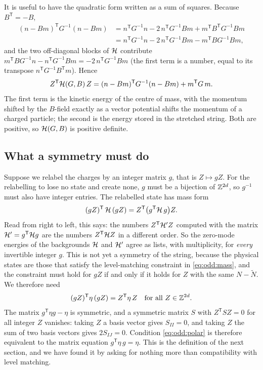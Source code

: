 It is useful to have the quadratic form written as a sum of squares. Because
$B^{\mathsf T}=-B$,
\begin{align}
 (n-Bm)^{\mathsf T}G^{-1}(n-Bm)
 &=n^{\mathsf T}G^{-1}n-2\,n^{\mathsf T}G^{-1}Bm+m^{\mathsf T}B^{\mathsf T}G^{-1}Bm\nonumber\\
 &=n^{\mathsf T}G^{-1}n-2\,n^{\mathsf T}G^{-1}Bm-m^{\mathsf T}BG^{-1}Bm ,\nonumber
\end{align}
and the two off-diagonal blocks of $\mathcal{H}$ contribute
$m^{\mathsf T}BG^{-1}n-n^{\mathsf T}G^{-1}Bm=-2\,n^{\mathsf T}G^{-1}Bm$ (the first term is a
number, equal to its transpose $n^{\mathsf T}G^{-1}B^{\mathsf T}m$). Hence
\begin{equation}\label{eq:odd:squares}
 Z^{\mathsf T}\mathcal{H}(G,B)\,Z=(n-Bm)^{\mathsf T}G^{-1}(n-Bm)+m^{\mathsf T}G\,m .
\end{equation}
The first term is the kinetic energy of the centre of mass, with the momentum shifted by the
$B$-field exactly as a vector potential shifts the momentum of a charged particle; the
second is the energy stored in the stretched string. Both are positive, so $\mathcal{H}(G,B)$ is
positive definite.

\subsection{What a symmetry must do}

Suppose we relabel the charges by an integer matrix $g$, that is $Z\mapsto gZ$. For the
relabelling to lose no state and create none, $g$ must be a bijection of $\mathbb{Z}^{2d}$, so
$g^{-1}$ must also have integer entries. The relabelled state has mass form
\begin{equation}\label{eq:odd:covariance}
 (gZ)^{\mathsf T}\,\mathcal{H}\,(gZ)=Z^{\mathsf T}\big(g^{\mathsf T}\mathcal{H}\, g\big)Z .
\end{equation}
Read from right to left, this says: the numbers $Z^{\mathsf T}\mathcal{H}'Z$ computed with the
matrix $\mathcal{H}'=g^{\mathsf T}\mathcal{H} g$ are the numbers $Z^{\mathsf T}\mathcal{H} Z$ in a different order.
So the zero-mode energies of the backgrounds $\mathcal{H}$ and $\mathcal{H}'$ agree as lists, with
multiplicity, for \emph{every} invertible integer $g$. This is not yet a symmetry of the
string, because the physical states are those that satisfy the level-matching constraint in
\eqref{eq:odd:mass}, and the constraint must hold for $gZ$ if and only if it holds for $Z$
with the same $N-\tilde N$. We therefore need
\begin{equation}\label{eq:odd:polar}
 (gZ)^{\mathsf T}\eta\,(gZ)=Z^{\mathsf T}\eta\,Z\quad\text{for all }Z\in\mathbb{Z}^{2d}.
\end{equation}
The matrix $g^{\mathsf T}\eta g-\eta$ is symmetric, and a symmetric matrix $S$ with
$Z^{\mathsf T}SZ=0$ for all integer $Z$ vanishes: taking $Z$ a basis vector gives
$S_{II}=0$, and taking $Z$ the sum of two basis vectors gives $2S_{IJ}=0$. Condition
\eqref{eq:odd:polar} is therefore equivalent to the matrix equation
$g^{\mathsf T}\eta\,g=\eta$. This is the definition of the next section, and we have
found it by asking for nothing more than compatibility with level matching.

